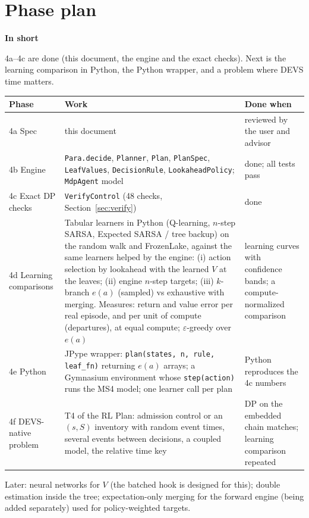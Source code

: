 \documentclass[11pt]{article}
\newcommand{\code}[1]{\texttt{#1}}
\newcommand{\shadedbox}[3]{\par\smallskip\noindent\colorbox{#1}{\parbox{\dimexpr\linewidth-2\fboxsep}{\textbf{#2}\par #3}}\par\smallskip}
\newcommand{\takeaway}[1]{\shadedbox{okbg}{In short}{#1}}
\theoremstyle{plain}
\begin{document}
\section{Phase plan}\label{sec:phases}

\takeaway{4a--4c are done (this document, the engine and the exact checks). Next is the learning comparison in
Python, the Python wrapper, and a problem where DEVS time matters.}

\begin{center}
\small
\begin{tabularx}{\linewidth}{@{}L{2.1cm} Y L{4.0cm}@{}}
\toprule
\textbf{Phase} & \textbf{Work} & \textbf{Done when}\\
\midrule
4a Spec & this document & reviewed by the user and advisor\\
4b Engine & \code{Para.decide}, \code{Planner}, \code{Plan}, \code{PlanSpec}, \code{LeafValues}, \code{DecisionRule},
  \code{LookaheadPolicy}; \code{MdpAgent} model & done; all tests pass\\
4c Exact DP checks & \code{VerifyControl} (48 checks, Section~\ref{sec:verify}) & done\\
4d Learning comparisons & Tabular learners in Python (Q-learning, $n$-step SARSA, Expected SARSA / tree backup) on the
  random walk and FrozenLake, against the same learners helped by the engine: (i) action selection by lookahead with
  the learned $V$ at the leaves; (ii) engine $n$-step targets; (iii) $k$-branch $e(a)$ (sampled) vs exhaustive with
  merging. Measures: return and value error per real episode, and per unit of compute (departures), at equal compute;
  $\varepsilon$-greedy over $e(a)$ & learning curves with confidence bands; a compute-normalized comparison\\
4e Python & JPype wrapper: \code{plan(states, n, rule, leaf\_fn)} returning $e(a)$ arrays; a Gymnasium environment
  whose \code{step(action)} runs the MS4 model; one learner call per plan & Python reproduces the 4c numbers\\
4f DEVS-native problem & T4 of the RL Plan: admission control or an $(s,S)$ inventory with random event times, several
  events between decisions, a coupled model, the relative time key & DP on the embedded chain matches; learning
  comparison repeated\\
\bottomrule
\end{tabularx}
\end{center}
Later: neural networks for $V$ (the batched hook is designed for this); double estimation inside the tree;
expectation-only merging for the forward engine (being added separately) used for policy-weighted targets.
\end{document}
